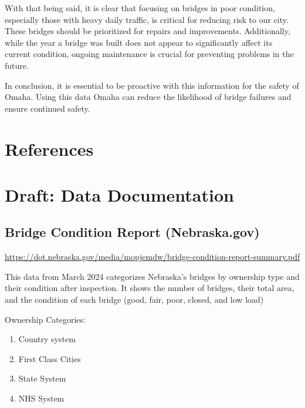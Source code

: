 \documentclass[
  letterpaper,
  DIV=11,
  numbers=noendperiod]{scrreprt}
\providecommand{\tightlist}{%
  \setlength{\itemsep}{0pt}\setlength{\parskip}{0pt}}\usepackage{longtable,booktabs,array}
\newlength{\cslhangindent}
\newenvironment{CSLReferences}[2] %
 {\begin{list}{}{%
  \setlength{\itemindent}{0pt}
  \setlength{\leftmargin}{0pt}
  \setlength{\parsep}{0pt}
  \ifodd #1
   \setlength{\leftmargin}{\cslhangindent}
   \setlength{\itemindent}{-1\cslhangindent}
  \fi
  \setlength{\itemsep}{#2\baselineskip}}}
 {\end{list}}
\begin{document}
With that being said, it is clear that focusing on bridges in poor
condition, especially those with heavy daily traffic, is critical for
reducing risk to our city. These bridges should be prioritized for
repairs and improvements. Additionally, while the year a bridge was
built does not appear to significantly affect its current condition,
ongoing maintenance is crucial for preventing problems in the future.

In conclusion, it is essential to be proactive with this information for
the safety of Omaha. Using this data Omaha can reduce the likelihood of
bridge failures and ensure continued safety.


\chapter*{References}\label{references}


\label{refs}
\begin{CSLReferences}{0}{1}
\end{CSLReferences}

\cleardoublepage
{}
{}
\appendix

\chapter{Draft: Data Documentation}\label{draft-data-documentation}

\section{Bridge Condition Report
(Nebraska.gov)}\label{bridge-condition-report-nebraska.gov}

\url{https://dot.nebraska.gov/media/mopjemdw/bridge-condition-report-summary.pdf}

This data from March 2024 categorizes Nebraska's bridges by ownership
type and their condition after inspection. It shows the number of
bridges, their total area, and the condition of each bridge (good, fair,
poor, closed, and low load)

Ownership Categories:

\begin{enumerate}
\def\labelenumi{\arabic{enumi}.}
\tightlist
\item
  Country system
\item
  First Class Cities
\item
  State System
\item
  NHS System
\end{enumerate}
\end{document}
